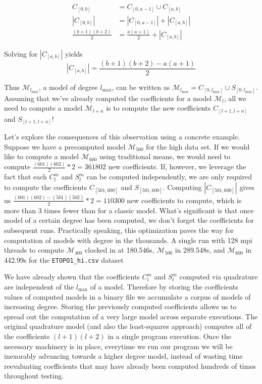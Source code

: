 \documentclass[a4paper]{article}
\theoremstyle{definition}
\begin{document}
\begin{align}
    C_{[0, b]} &= C_{[0, a - 1]} \cup C_{[a, b]} \\
    |C_{[0, b]}| &= |C_{[0, a - 1]}| + |C_{[a, b]}| \\
    \frac{(b + 1)(b + 2)}{2} &= \frac{a(a + 1)}{2} + |C_{[a, b]}|
\end{align}

Solving for $|C_{[a, b]}|$ yields 
\begin{equation}
    |C_{[a, b]}| = \frac{(b + 1)(b + 2) - a(a + 1)}{2} \label{fig:cardinality}
\end{equation}

Thus $\mathcal{M}_{l_\mathrm{max}}$, a model of degree $l_{\mathrm{max}}$, can be written as $\mathcal{M}_{l_\mathrm{max}} = C_{[0, l_{\mathrm{max}}]} \cup S_{[0, l_{\mathrm{max}}]}$. Assuming that we've already computed the coefficients for a model 
$\mathcal{M}_l$, all we need to compute a model $\mathcal{M}_{l + n}$ is to compute the new coefficients $C_{[l + 1, l + n]}$ and $S_{[l + 1, l + n]}$!

Let's explore the consequences of this observation using a concrete example. Suppose we have a precomputed model $\mathcal{M}_{500}$ for the high data set. If we would 
like to compute a model $\mathcal{M}_{600}$ using traditional means, we would need to compute $\frac{(601)(602)}{2} * 2 = 361802$ new coefficients. If, however, we leverage the fact
that each $C_l^m$ and $S_l^m$ can be computed independently, we are only required to compute the coefficients $C_{[501, 600]}$ and $S_{[501, 600]}$. Computing
$|C_{[501, 600]}|$ gives us $\frac{(601)(602) - (501)(502)}{2} * 2 = 110300$ new coefficients to compute, which is more than 3 times fewer than for a classic model. What's significant is that 
once model of a certain degree has been computed, we don't forget the coefficients for subsequent runs. Practically speaking, this optimization paves the way for computation of models with degree 
in the thousands. A single run with 128 mpi threads to compute $\mathcal{M}_{400}$ clocked in at 180.546s, $\mathcal{M}_{500}$ in 289.548s, and $\mathcal{M}_{600}$ in 442.99s for the \texttt{ETOPO1\_hi.csv} dataset 

We have already shown that the coefficients $C_l^m$ and $S_l^m$ computed via quadrature are independent of the $l_\mathrm{max}$ of a model. Therefore by storing the coefficients values of computed models in a 
binary file we accumulate a corpus of models of increasing degree. Storing the previously computed coefficients allows us to spread out the computation of a 
very large model across separate executions. The original quadrature model (and also the least-squares approach) computes all of the coefficients $(l + 1)(l + 2)$ 
in a single program execution. Once the necessary machinery is in place, everytime we run our program we will be inexorably advancing towards a higher degree 
model, instead of wasting time reevaluating coefficients that may have already been computed hundreds of times throughout testing.
\end{document}
